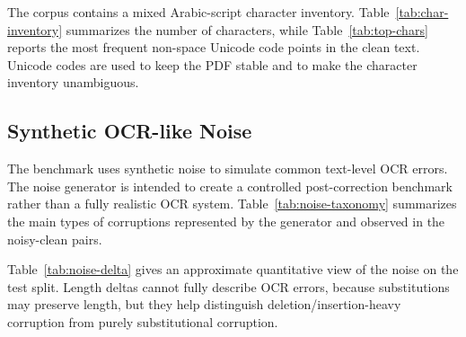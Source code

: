 \documentclass{article}
\begin{document}
The corpus contains a mixed Arabic-script character inventory. Table~\ref{tab:char-inventory} summarizes the number of characters, while Table~\ref{tab:top-chars} reports the most frequent non-space Unicode code points in the clean text. Unicode codes are used to keep the PDF stable and to make the character inventory unambiguous.

\begin{table}[tbh!]
\begin{center}

\caption{Character inventory summary for clean and noisy text.}
\label{tab:char-inventory}
\end{center}
\end{table}

\begin{table}[tbh!]
\begin{center}
\small

\caption{Most frequent non-space Unicode code points in the clean corpus.}
\label{tab:top-chars}
\end{center}
\end{table}

\subsection{Synthetic OCR-like Noise}

The benchmark uses synthetic noise to simulate common text-level OCR errors. The noise generator is intended to create a controlled post-correction benchmark rather than a fully realistic OCR system. Table~\ref{tab:noise-taxonomy} summarizes the main types of corruptions represented by the generator and observed in the noisy-clean pairs.

\begin{table}[tbh!]
\begin{center}
\small

\caption{Synthetic OCR-like noise taxonomy used in the benchmark.}
\label{tab:noise-taxonomy}
\end{center}
\end{table}

Table~\ref{tab:noise-delta} gives an approximate quantitative view of the noise on the test split. Length deltas cannot fully describe OCR errors, because substitutions may preserve length, but they help distinguish deletion/insertion-heavy corruption from purely substitutional corruption.

\begin{table}[tbh!]
\begin{center}

\caption{Approximate noisy-clean length-delta statistics on the test split.}
\label{tab:noise-delta}
\end{center}
\end{table}
\end{document}
